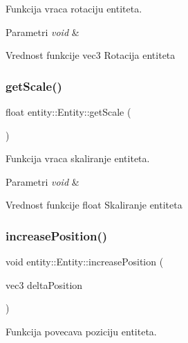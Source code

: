 Funkcija vraca rotaciju entiteta. 


\begin{DoxyParams}{Parametri}
{\em void} & \\
\hline
\end{DoxyParams}
\begin{DoxyReturn}{Vrednost funkcije}
vec3 Rotacija entiteta 
\end{DoxyReturn}
\mbox{\label{classentity_1_1Entity_a1923a9ecf9da2ec77d6e3eeadb4bd4d7}} 
\subsubsection{\texorpdfstring{get\+Scale()}{getScale()}}
{\footnotesize\ttfamily float entity\+::\+Entity\+::get\+Scale (\begin{DoxyParamCaption}{ }\end{DoxyParamCaption})}



Funkcija vraca skaliranje entiteta. 


\begin{DoxyParams}{Parametri}
{\em void} & \\
\hline
\end{DoxyParams}
\begin{DoxyReturn}{Vrednost funkcije}
float Skaliranje entiteta 
\end{DoxyReturn}
\mbox{\label{classentity_1_1Entity_a24a22a1554a3a412cc2583bbf87fd77c}} 
\subsubsection{\texorpdfstring{increase\+Position()}{increasePosition()}}
{\footnotesize\ttfamily void entity\+::\+Entity\+::increase\+Position (\begin{DoxyParamCaption}\item[{vec3}]{delta\+Position }\end{DoxyParamCaption})}



Funkcija povecava poziciju entiteta. 


